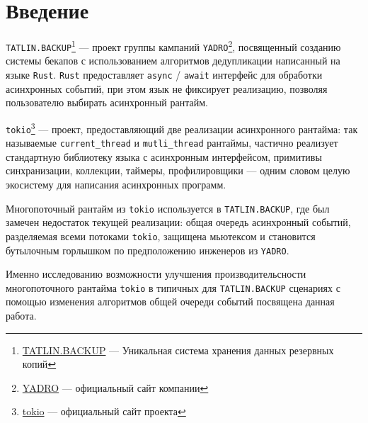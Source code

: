 
\section*{Введение}
\thispagestyle{withCompileDate}

\verb|TATLIN.BACKUP|\footnote{\href{https://yadro.com/ru/tatlin/backup}{TATLIN.BACKUP}
--- Уникальная система хранения данных резервных копий} --- проект группы кампаний \verb|YADRO|\footnote{\href{https://yadro.com/}{YADRO} --- официальный сайт компании}, посвященный созданию системы бекапов с использованием алгоритмов дедупликации написанный на языке \verb|Rust|. \verb|Rust| предоставляет \verb|async| / \verb|await| интерфейс для обработки асинхронных событий, при этом язык не фиксирует реализацию, позволяя пользователю выбирать асинхронный рантайм.

\verb|tokio|\footnote{\href{https://tokio.rs/}{tokio} --- официальный сайт проекта} --- проект, предоставляющий две реализации асинхронного рантайма: так называемые \verb|current_thread| и \verb|mutli_thread| рантаймы, частично реализует стандартную библиотеку языка с асинхронным интерфейсом, примитивы синхранизации, коллекции, таймеры, профилировщики --- одним словом целую экосистему для написания асинхронных программ.

Многопоточный рантайм из \verb|tokio| используется в \verb|TATLIN.BACKUP|, где был замечен недостаток текущей реализации: общая очередь асинхронный событий, разделяемая всеми потоками \verb|tokio|, защищена мьютексом и становится бутылочным горлышком по предположению инженеров из \verb|YADRO|.

Именно исследованию возможности улучшения производительсности многопоточного рантайма \verb|tokio| в типичных для \verb|TATLIN.BACKUP| сценариях с помощью изменения алгоритмов общей очереди событий посвящена данная работа.
